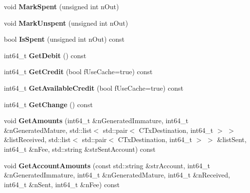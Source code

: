 \begin{DoxyCompactItemize}
\item 
\mbox{\label{class_c_wallet_tx_af2fc13459e324ad2b3f7c9914d86e7c8}} 
void {\bfseries Mark\+Spent} (unsigned int n\+Out)
\item 
\mbox{\label{class_c_wallet_tx_a15588d9e12497ec4c10a53ab629fa244}} 
void {\bfseries Mark\+Unspent} (unsigned int n\+Out)
\item 
\mbox{\label{class_c_wallet_tx_a6b01c779a9ddc9d3554b7ec1b770f512}} 
bool {\bfseries Is\+Spent} (unsigned int n\+Out) const
\item 
\mbox{\label{class_c_wallet_tx_ab50a9eefa0fd6112451da9bddda37d00}} 
int64\+\_\+t {\bfseries Get\+Debit} () const
\item 
\mbox{\label{class_c_wallet_tx_aa67f11dabd7531c7ff668f37215124ab}} 
int64\+\_\+t {\bfseries Get\+Credit} (bool f\+Use\+Cache=true) const
\item 
\mbox{\label{class_c_wallet_tx_a8e57c81fcf9481bc19287549eecd0e54}} 
int64\+\_\+t {\bfseries Get\+Available\+Credit} (bool f\+Use\+Cache=true) const
\item 
\mbox{\label{class_c_wallet_tx_aa12f4a51d7b35b07bd70a8da793e209d}} 
int64\+\_\+t {\bfseries Get\+Change} () const
\item 
\mbox{\label{class_c_wallet_tx_a204644f01533f376287918572e0314ce}} 
void {\bfseries Get\+Amounts} (int64\+\_\+t \&n\+Generated\+Immature, int64\+\_\+t \&n\+Generated\+Mature, std\+::list$<$ std\+::pair$<$ C\+Tx\+Destination, int64\+\_\+t $>$ $>$ \&list\+Received, std\+::list$<$ std\+::pair$<$ C\+Tx\+Destination, int64\+\_\+t $>$ $>$ \&list\+Sent, int64\+\_\+t \&n\+Fee, std\+::string \&str\+Sent\+Account) const
\item 
\mbox{\label{class_c_wallet_tx_a6192152275d500f870b3ef29266d07c0}} 
void {\bfseries Get\+Account\+Amounts} (const std\+::string \&str\+Account, int64\+\_\+t \&n\+Generated\+Immature, int64\+\_\+t \&n\+Generated\+Mature, int64\+\_\+t \&n\+Received, int64\+\_\+t \&n\+Sent, int64\+\_\+t \&n\+Fee) const
\item 

\end{DoxyCompactItemize}
